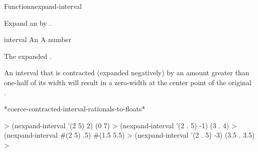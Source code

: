 \documentclass[10pt,twoside,english,pdftex]{article}
\begin{document}
\begin{functiondoc}{Function}{nexpand-interval}%
  {
    }
%
%

\fnsyntax

\fnpurpose Expand an  by .

\fnpackage {}

\fnmodule {}

\fnargs
\begin{args}{interval}
\arg[interval] An 
\arg[amount] A number
\end{args}

\fnreturns The expanded .

\fndescription An interval that is contracted (expanded negatively) by an
amount greater than one-half of its width will result in a zero-width
 at the center point of the original .

\begin{alsos}{*coerce-contracted-interval-rationals-to-floats*}
\end{alsos}

\fnexamples
%
\W\supp
\begin{example}
  > (nexpand-interval '(2 5) 2)
  (0 7)
  > (nexpand-interval '(2 . 5) -1)
  (3 . 4)\goodpagebreak
  > (nexpand-interval #(2 5) .5)
  #(1.5 5.5)
  > (nexpand-interval '(2 . 5) -3)
  (3.5 . 3.5)
  >
\end{example}

\end{functiondoc}

\end{document}
